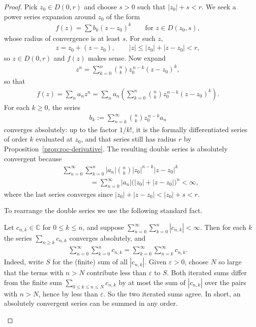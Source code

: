 \documentclass[11pt]{article}
\theoremstyle{plain}
\theoremstyle{definition}
\theoremstyle{remark}
\numberwithin{equation}{section}
\newcommand{\be}{\begin{eqnarray}}
\newcommand{\ee}{\end{eqnarray}}
\newcommand{\C}{\mathbb{C}}
\begin{document}
\begin{proof}
Pick $z_0\in D(0,r)$ and choose $s>0$ such that $|z_0|+s<r$. We seek a
power series expansion around $z_0$ of the form
\be
 f(z)=\sum b_k(z-z_0)^k\qquad\text{for }z\in D(z_0,s),
\ee
whose radius of convergence is at least $s$. For such $z$,
\be
 z=z_0+(z-z_0),\qquad |z|\le|z_0|+|z-z_0|<r,
\ee
so $z\in D(0,r)$ and $f(z)$ makes sense. Now expand
\be
 z^n=\sum_{k=0}^{n}\binom nk z_0^{\,n-k}(z-z_0)^k,
\ee
so that
\be
 f(z)=\sum_n a_nz^n
 =\sum_n a_n\left(\sum_{k=0}^{n}\binom nk z_0^{\,n-k}(z-z_0)^k\right).
\ee
For each $k\geq0$, the series
\be
 b_k:=\sum_{n=k}^{\infty}\binom nk z_0^{\,n-k}a_n
\ee
converges absolutely: up to the factor $1/k!$, it is the formally
differentiated series of order $k$ evaluated at $z_0$, and that series still
has radius $r$ by Proposition~\ref{prop:roc-derivative}.
The resulting double series is absolutely convergent because
\begin{align*}
 &\sum_{n=0}^{\infty}\sum_{k=0}^{n}
 |a_n|\binom nk|z_0|^{n-k}|z-z_0|^k\\
 &\hspace{4em}=
 \sum_{n=0}^{\infty}|a_n|\bigl(|z_0|+|z-z_0|\bigr)^n<\infty,
\end{align*}
where the last series converges since $|z_0|+|z-z_0|<|z_0|+s<r$.

To rearrange the double series we use the following standard fact.

\begin{tcolorbox}[
  enhanced,
  colback=lightorange,
  colframe=orangeframe,
  coltitle=white,
  fonttitle=\bfseries,
  title={Rearranging absolutely convergent double series},
  unbreakable,
  boxrule=0.7pt,
  arc=2pt,
  left=6pt,
  right=6pt,
  top=5pt,
  bottom=5pt
]
Let $c_{n,k}\in\C$ for $0\leq k\leq n$, and suppose
$\sum_{n=0}^{\infty}\sum_{k=0}^{n}|c_{n,k}|<\infty$. Then for each $k$ the
series $\sum_{n\geq k}c_{n,k}$ converges absolutely, and
\be
 \sum_{n=0}^{\infty}\sum_{k=0}^{n}c_{n,k}
 =\sum_{k=0}^{\infty}\sum_{n=k}^{\infty}c_{n,k}.
\ee
Indeed, write $S$ for the (finite) sum of all $|c_{n,k}|$. Given
$\varepsilon>0$, choose $N$ so large that the terms with $n>N$ contribute
less than $\varepsilon$ to $S$. Both iterated sums differ from the finite
sum $\sum_{0\leq k\leq n\leq N}c_{n,k}$ by at most the sum of
$|c_{n,k}|$ over the pairs with $n>N$, hence by less than $\varepsilon$.
So the two iterated sums agree. In short, an absolutely convergent series
can be summed in any order.
\end{tcolorbox}


\end{proof}
\end{document}
